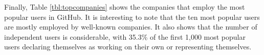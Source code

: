 Finally, Table \ref{tbl:topcompanies} shows the companies that employ the most popular users in GitHub. It is interesting to note that the ten most popular users are mostly employed by well-known companies. It also shows that the number of independent users is considerable, with 35.3\% of the first 1,000 most popular users declaring themselves as working on their own or representing themselves.

